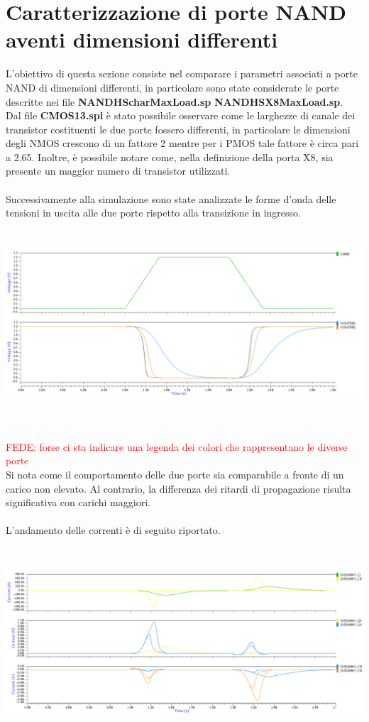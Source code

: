 \documentclass[11pt,  english, makeidx, a4paper, titlepage, oneside]{book}
\begin{document}
\section{Caratterizzazione di porte NAND aventi dimensioni differenti}
L'obiettivo di questa sezione consiste nel comparare i parametri associati a porte NAND di dimensioni differenti, in particolare sono state considerate le porte descritte nei file \textbf{NANDHScharMaxLoad.sp} \textbf{NANDHSX8MaxLoad.sp}.
\\
Dal file \textbf{CMOS13.spi} è stato possibile osservare come le larghezze di canale dei transistor costituenti le due porte fossero differenti, in particolare le dimensioni degli NMOS crescono di un fattore 2 mentre per i PMOS tale fattore è circa pari a 2.65. Inoltre, è possibile notare come, nella definizione della porta X8, sia presente un maggior numero di transistor utilizzati.
\\\\
Successivamente alla simulazione sono state analizzate le forme d'onda delle tensioni in uscita alle due porte rispetto alla transizione in ingresso.
\\\\
\centerline{\includegraphics[width=14cm]{./img/Lab_5/waveform_4.png}}
\\\\
\textcolor{red}{FEDE: forse ci sta indicare una legenda dei colori che rappresentano le diverse porte\\}
Si nota come il comportamento delle due porte sia comparabile a fronte di un carico non elevato. Al contrario, la differenza dei ritardi di propagazione risulta significativa con carichi maggiori.
\\\\
L'andamento delle correnti è di seguito riportato.
\\\\
\centerline{\includegraphics[width=14cm]{./img/Lab_5/waveform_5.png}}
\end{document}

